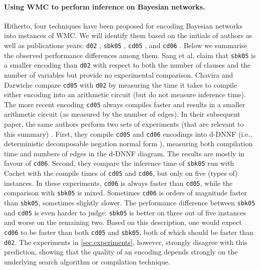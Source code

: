 \documentclass{article}
\theoremstyle{definition}
\theoremstyle{remark}
\begin{document}
\paragraph{Using WMC to perform inference on Bayesian networks.} Hitherto, four
techniques have been proposed for encoding Bayesian networks into instances of
WMC. We will identify them based on the initials of authors as well as
publications years: \texttt{d02} \cite{DBLP:conf/kr/Darwiche02}, \texttt{sbk05}
\cite{DBLP:conf/aaai/SangBK05}, \texttt{cd05} \cite{DBLP:conf/ijcai/ChaviraD05},
and \texttt{cd06} \cite{DBLP:conf/sat/ChaviraD06}. Below we summarise the
observed performance differences among them. Sang et al.
\cite{DBLP:conf/aaai/SangBK05} claim that \texttt{sbk05} is a smaller encoding
than \texttt{d02} with respect to both the number of clauses and the number of
variables but provide no experimental comparison. Chavira and Darwiche
\cite{DBLP:conf/ijcai/ChaviraD05} compare \texttt{cd05} with \texttt{d02} by
measuring the time it takes to compile either encoding into an arithmetic
circuit (but do not measure inference time). The more recent encoding
\texttt{cd05} always compiles faster and results in a smaller arithmetic circuit
(as measured by the number of edges). In their subsequent paper, the same
authors perform two sets of experiments (that are relevant to this summary)
\cite{DBLP:conf/sat/ChaviraD06}. First, they compile \texttt{cd05} and
\texttt{cd06} encodings into d-DNNF (i.e., deterministic decomposable negation
normal form \cite{DBLP:journals/jancl/Darwiche01}), measuring both compilation
time and numbers of edges in the d-DNNF diagram. The results are mostly in
favour of \texttt{cd06}. Second, they compare the inference time of
\texttt{sbk05} run with Cachet \cite{DBLP:conf/sat/SangBBKP04} with the compile
times of \texttt{cd05} and \texttt{cd06}, but only on five (types of) instances.
In these experiments, \texttt{cd06} is always faster than \texttt{cd05}, while
the comparison with \texttt{sbk05} is mixed. Sometimes \texttt{cd06} is orders
of magnitude faster than \texttt{sbk05}, sometimes slightly slower. The
performance difference between \texttt{sbk05} and \texttt{cd05} is even harder
to judge: \texttt{sbk05} is better on three out of five instances and worse on
the remaining two. Based on this description, one would expect \texttt{cd06} to
be faster than both \texttt{cd05} and \texttt{sbk05}, both of which should be
faster than \texttt{d02}. The experiments in \cref{sec:experiments}, however,
strongly disagree with this prediction, showing that the quality of an encoding
depends strongly on the underlying search algorithm or compilation technique.
\end{document}
